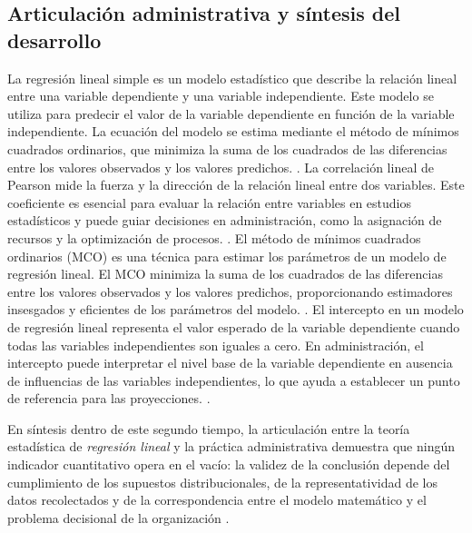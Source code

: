 {\subsection{Articulación administrativa y síntesis del desarrollo}
La regresión lineal simple es un modelo estadístico que describe la relación lineal entre una variable dependiente y una variable independiente. Este modelo se utiliza para predecir el valor de la variable dependiente en función de la variable independiente. La ecuación del modelo se estima mediante el método de mínimos cuadrados ordinarios, que minimiza la suma de los cuadrados de las diferencias entre los valores observados y los valores predichos. \citep{holmesBusiness2023,nistHandbook}.
La correlación lineal de Pearson mide la fuerza y la dirección de la relación lineal entre dos variables. Este coeficiente es esencial para evaluar la relación entre variables en estudios estadísticos y puede guiar decisiones en administración, como la asignación de recursos y la optimización de procesos. \citep{holmesBusiness2023,nistHandbook}.
El método de mínimos cuadrados ordinarios (MCO) es una técnica para estimar los parámetros de un modelo de regresión lineal. El MCO minimiza la suma de los cuadrados de las diferencias entre los valores observados y los valores predichos, proporcionando estimadores insesgados y eficientes de los parámetros del modelo. \citep{holmesBusiness2023,nistHandbook}.
El intercepto en un modelo de regresión lineal representa el valor esperado de la variable dependiente cuando todas las variables independientes son iguales a cero. En administración, el intercepto puede interpretar el nivel base de la variable dependiente en ausencia de influencias de las variables independientes, lo que ayuda a establecer un punto de referencia para las proyecciones. \citep{holmesBusiness2023,nistHandbook}.

En síntesis dentro de este segundo tiempo, la articulación entre la teoría estadística de \textit{regresión lineal} y la práctica administrativa demuestra que ningún indicador cuantitativo opera en el vacío: la validez de la conclusión depende del cumplimiento de los supuestos distribucionales, de la representatividad de los datos recolectados y de la correspondencia entre el modelo matemático y el problema decisional de la organización \citep{anderson2012,nistHandbook,guarin2002}.

\clearpage
}
